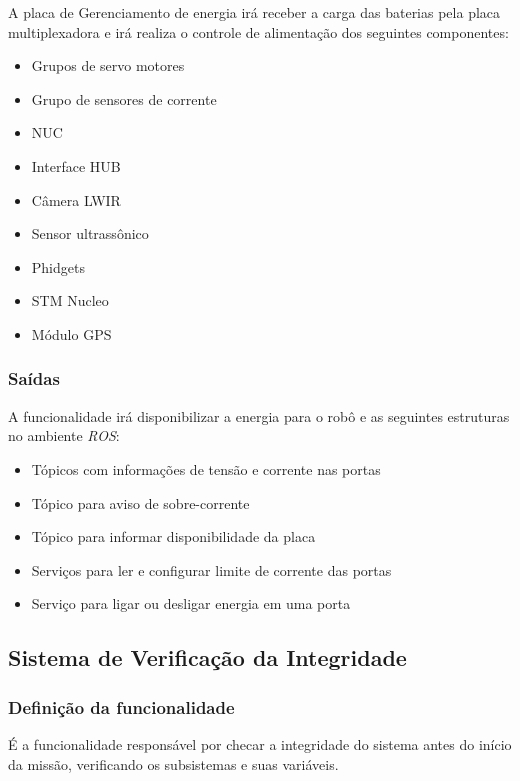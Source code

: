 A placa de Gerenciamento de energia irá receber a carga das baterias pela placa multiplexadora e irá realiza o controle de alimentação dos seguintes componentes:
\begin{itemize}
	\item Grupos de servo motores
	\item Grupo de sensores de corrente
	\item NUC
	\item Interface HUB
	\item Câmera LWIR
	\item Sensor ultrassônico
	\item Phidgets
	\item STM Nucleo
	\item Módulo GPS
\end{itemize}

\subsubsection{Saídas}
A funcionalidade irá disponibilizar a energia para o robô e as seguintes estruturas no ambiente \textit{ROS}:
\begin{itemize}
	\item Tópicos com informações de tensão e corrente nas portas
	\item Tópico para aviso de sobre-corrente
	\item Tópico para informar disponibilidade da placa
	\item Serviços para ler e configurar limite de corrente das portas
	\item Serviço para ligar ou desligar energia em uma porta	
\end{itemize}

\subsection{Sistema de Verificação da Integridade}
\label{ssec:check}

\subsubsection{Definição da funcionalidade}
É a funcionalidade responsável por checar a integridade do sistema antes do início da missão, verificando os subsistemas e suas variáveis.

